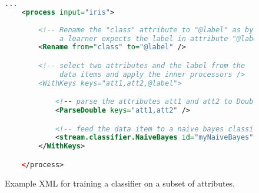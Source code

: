 \begin{figure}[h!]
  \centering
  \begin{lstlisting}[language=XML]
    ...
    <process input="iris">
       
        <!-- Rename the "class" attribute to "@label" as by convention
             a learner expects the label in attribute "@label"        -->
        <Rename from="class" to="@label" />

        <!-- select two attributes and the label from the
             data items and apply the inner processors />
        <WithKeys keys="att1,att2,@label">

            <!-- parse the attributes att1 and att2 to Double values -->
            <ParseDouble keys="att1,att2" />

            <!-- feed the data item to a naive bayes classifier for training -->
            <stream.classifier.NaiveBayes id="myNaiveBayes" />
        </WithKeys>

    </process>
  \end{lstlisting}
  \caption{\label{fig:exampleWithKeys}Example XML for training a
    classifier on a subset of attributes.}
\end{figure}





